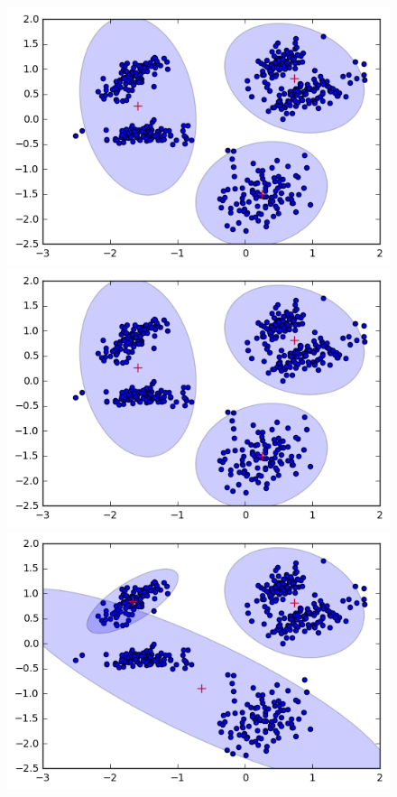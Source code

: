 \documentclass[a4paper,11pt]{article}
\begin{document}
\begin{figure}[htbp]
  \includegraphics[scale=0.2]{k3nk7.png}
  \includegraphics[scale=0.2]{k3nk8.png}
  \includegraphics[scale=0.2]{k3nk9.png}

\end{figure}
\end{document}
